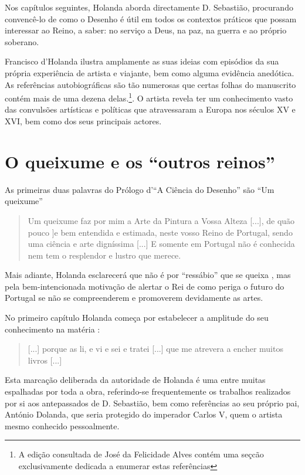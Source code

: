 \documentclass{article}
\begin{document}
Nos capítulos seguintes, Holanda aborda directamente D. Sebastião,
procurando convencê-lo de como o Desenho é útil em todos os contextos
práticos que possam interessar ao Reino, a saber: no serviço a Deus, na
paz, na guerra e ao próprio soberano.

Francisco d'Holanda ilustra amplamente as suas ideias com episódios da
sua própria experiência de artista e viajante, bem como alguma
evidência anedótica. As referências autobiográficas são tão numerosas
que certas folhas do manuscrito contém mais de uma dezena
delas.\footnote{A edição consultada de José da Felicidade Alves contém
  uma seçcão exclusivamente dedicada a enumerar estas referências}. O 
artista revela ter um conhecimento vasto das convulsões artísticas e 
políticas que atravessaram a Europa nos séculos XV e XVI, bem como dos
seus principais actores.

\section{O queixume e os ``outros reinos''}

As primeiras duas palavras do Prólogo d'``A Ciência do Desenho'' são
``Um queixume'' \cite[fl.34r]{holanda}

\begin{quote}
  Um queixume faz por mim a Arte da Pintura a Vossa Alteza [...], de
  quão pouco ]e bem entendida e estimada, neste vosso Reino de
    Portugal, sendo uma ciência e arte digníssima [...] E somente em
    Portugal não é conhecida nem tem o resplendor e lustro que merece.
\end{quote}

Mais adiante, Holanda esclarecerá que não é por ``ressábio'' que se
queixa \cite[fl.36v]{holanda}, mas pela bem-intencionada motivação de
alertar o Rei de como periga o futuro do Portugal se não se
compreenderem e promoverem devidamente as artes.

No primeiro capítulo Holanda começa por estabelecer a amplitude do seu
conhecimento na matéria \cite[fl.34r]{holanda}:

\begin{quote}
  [...] porque as li, e vi e sei e tratei [...] que me atrevera a
  encher muitos livros [...]
\end{quote}

Esta marcação deliberada da autoridade de Holanda é uma entre muitas
espalhadas por toda a obra, referindo-se frequentemente os trabalhos
realizados por si aos antepassados de D. Sebastião, bem como
referências ao seu próprio pai, António Dolanda, que seria protegido
do imperador Carlos V, quem o artista mesmo conhecido pessoalmente.
\end{document}
